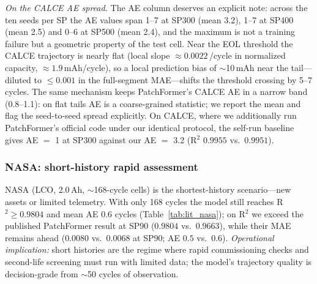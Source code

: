 \emph{On the CALCE AE spread.} The AE column deserves an
explicit note: across the ten seeds per SP the AE values span
1--7 at SP300 (mean 3.2), 1--7 at SP400 (mean 2.5) and 0--6 at
SP500 (mean 2.4), and the maximum is not a training failure but a
geometric property of the test cell. Near the EOL threshold the
CALCE trajectory is nearly flat (local slope $\approx 0.0022$\,/cycle
in normalized capacity, $\approx 1.9$\,mAh/cycle), so a local
prediction bias of $\sim$10\,mAh near the tail---diluted
to $\le 0.001$ in the full-segment MAE---shifts the threshold
crossing by 5--7 cycles.
The same mechanism keeps PatchFormer's CALCE AE in a narrow band
(0.8--1.1): on flat tails AE is a coarse-grained statistic; we report the
mean and flag the seed-to-seed spread explicitly. On CALCE, where we
additionally run PatchFormer's official code under our identical
protocol, the self-run baseline gives AE $=$ 1 at SP300 against our
AE $=$ 3.2 (R$^2$ $0.9955$ vs.\ $0.9951$).

\subsubsection{NASA: short-history rapid assessment}
NASA (LCO, 2.0\,Ah, $\sim$168-cycle cells) is the shortest-history
scenario---new assets or limited telemetry. With only 168 cycles the
model still reaches R$^2 \ge 0.9804$ and mean AE $0.6$ cycles
(Table~\ref{tab:lit_nasa}); on R$^2$ we exceed the published
PatchFormer result at SP90
($0.9804$ vs.\ $0.9663$), while their MAE remains ahead
($0.0080$ vs.\ $0.0068$ at SP90; AE $0.5$ vs.\ $0.6$).
\emph{Operational implication:}
short histories are the regime where rapid commissioning checks and
second-life screening must run with limited data; the model's
trajectory quality is decision-grade from $\sim$50 cycles of
observation.

